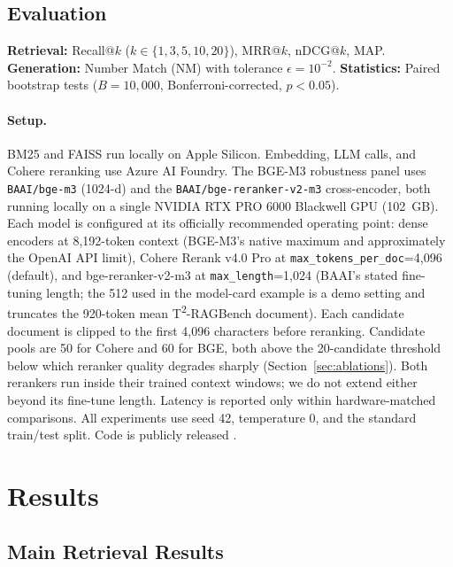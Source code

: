 \documentclass{article}
\begin{document}
\subsection{Evaluation}
\label{sec:metrics}

\textbf{Retrieval:} Recall@$k$ ($k \in \{1,3,5,10,20\}$), MRR@$k$, nDCG@$k$, MAP. \textbf{Generation:} Number Match (NM) with tolerance $\epsilon = 10^{-2}$. \textbf{Statistics:} Paired bootstrap tests ($B = 10{,}000$, Bonferroni-corrected, $p < 0.05$).

\paragraph{Setup.}
\label{sec:setup}
BM25 and FAISS run locally on Apple Silicon. Embedding, LLM calls, and Cohere reranking use Azure AI Foundry. The BGE-M3 robustness panel uses \texttt{BAAI/bge-m3} (1024-d) \citep{chen2024bgem3} and the \texttt{BAAI/bge-reranker-v2-m3} cross-encoder, both running locally on a single NVIDIA RTX PRO 6000 Blackwell GPU (102~GB). Each model is configured at its officially recommended operating point: dense encoders at 8{,}192-token context (BGE-M3's native maximum and approximately the OpenAI API limit), Cohere Rerank v4.0 Pro at \texttt{max\_tokens\_per\_doc}=4{,}096 (default), and bge-reranker-v2-m3 at \texttt{max\_length}=1{,}024 (BAAI's stated fine-tuning length; the 512 used in the model-card example is a demo setting and truncates the 920-token mean T\textsuperscript{2}-RAGBench document). Each candidate document is clipped to the first 4{,}096 characters before reranking. Candidate pools are 50 for Cohere and 60 for BGE, both above the 20-candidate threshold below which reranker quality degrades sharply (Section~\ref{sec:ablations}). Both rerankers run inside their trained context windows; we do not extend either beyond its fine-tune length. Latency is reported only within hardware-matched comparisons. All experiments use seed 42, temperature 0, and the standard train/test split. Code is publicly released \citep{karaman2026ragcode}.

\section{Results}
\label{sec:results}

\subsection{Main Retrieval Results}
\label{sec:main_results}
\end{document}
